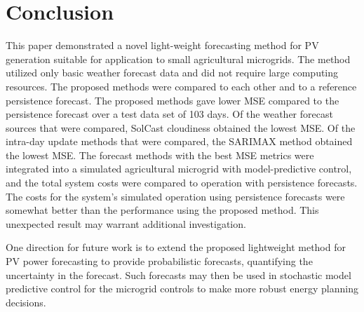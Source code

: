 \section{Conclusion}
\label{sec:conclusion}

This paper demonstrated a novel light-weight forecasting method for PV generation suitable for application to small agricultural microgrids.
The method utilized only basic weather forecast data and did not require large computing resources.
The proposed methods were compared to each other and to a reference persistence forecast.
The proposed methods gave lower MSE compared to the persistence forecast
over a test data set of
103 days.
Of the weather forecast sources that were compared,
SolCast cloudiness
obtained the lowest MSE.
Of the intra-day update methods that were compared,
the SARIMAX method
obtained the lowest MSE.
The forecast methods with the best MSE metrics were integrated into a simulated
agricultural microgrid with model-predictive control,
and the total system costs were compared to operation with persistence forecasts.
The costs for the system's simulated operation using persistence forecasts were somewhat better than the performance using the proposed method.
This unexpected result may warrant additional investigation.

One direction for future work is to extend the proposed lightweight method for PV power forecasting to provide probabilistic forecasts, quantifying the uncertainty in the forecast.
Such forecasts may then be used in stochastic model predictive control for the microgrid controls to make more robust energy planning decisions.
